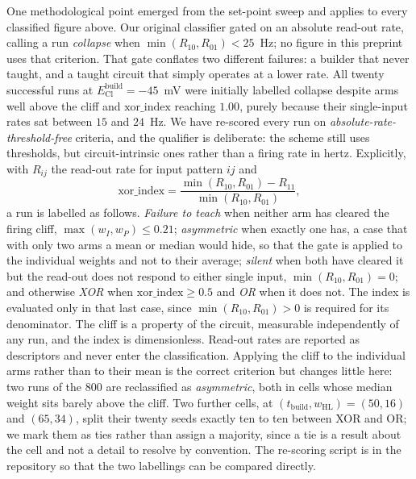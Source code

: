 \documentclass[11pt,a4paper]{article}
\newcommand{\ECl}{E_{\mathrm{Cl}}}
\begin{document}
\FloatBarrier
One methodological point emerged from the set-point sweep and applies to every classified figure above. Our original classifier gated on an absolute read-out rate, calling a run \emph{collapse} when $\min(R_{10},R_{01})<25$~Hz; no figure in this preprint uses that criterion. That gate conflates two different failures: a builder that never taught, and a taught circuit that simply operates at a lower rate. All twenty successful runs at $\ECl^{\mathrm{build}}=-45$~mV were initially labelled collapse despite arms well above the cliff and $\mathrm{xor\_index}$ reaching $1.00$, purely because their single-input rates sat between $15$ and $24$~Hz. We have re-scored every run on \emph{absolute-rate-threshold-free} criteria, and the qualifier is deliberate: the scheme still uses thresholds, but circuit-intrinsic ones rather than a firing rate in hertz. Explicitly, with $R_{ij}$ the read-out rate for input pattern $ij$ and
\[
\mathrm{xor\_index}=\frac{\min(R_{10},R_{01})-R_{11}}{\min(R_{10},R_{01})},
\]
a run is labelled as follows. \emph{Failure to teach} when neither arm has cleared the firing cliff, $\max(w_I,w_P)\leq0.21$; \emph{asymmetric} when exactly one has, a case that with only two arms a mean or median would hide, so that the gate is applied to the individual weights and not to their average; \emph{silent} when both have cleared it but the read-out does not respond to either single input, $\min(R_{10},R_{01})=0$; and otherwise \emph{XOR} when $\mathrm{xor\_index}\geq0.5$ and \emph{OR} when it does not. The index is evaluated only in that last case, since $\min(R_{10},R_{01})>0$ is required for its denominator. The cliff is a property of the circuit, measurable independently of any run, and the index is dimensionless. Read-out rates are reported as descriptors and never enter the classification. Applying the cliff to the individual arms rather than to their mean is the correct criterion but changes little here: two runs of the $800$ are reclassified as \emph{asymmetric}, both in cells whose median weight sits barely above the cliff. Two further cells, at $(t_{\mathrm{build}},w_{\mathrm{HL}})=(50,16)$ and $(65,34)$, split their twenty seeds exactly ten to ten between XOR and OR; we mark them as ties rather than assign a majority, since a tie is a result about the cell and not a detail to resolve by convention. The re-scoring script is in the repository so that the two labellings can be compared directly.
\end{document}
